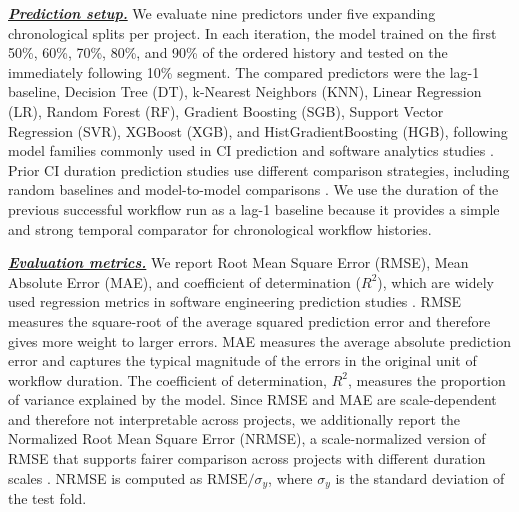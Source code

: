 \documentclass[conference]{IEEEconf}
\newcommand{\ali}[1]{\textcolor{red}{{\it [Ali: #1]}}}
\newcommand{\jasem}[1]{\textcolor{blue}{{\it [Jasem: #1]}}}
\begin{document}
\noindent\underline{\textbf{\textit{Prediction setup.}}} We evaluate nine predictors under five expanding chronological splits per project. In each iteration, the model trained on the first 50\%, 60\%, 70\%, 80\%, and 90\% of the ordered history and tested on the immediately following 10\% segment. The compared predictors were the lag-1 baseline, Decision Tree (DT), k-Nearest Neighbors (KNN), Linear Regression (LR), Random Forest (RF), Gradient Boosting (SGB), Support Vector Regression (SVR), XGBoost (XGB), and HistGradientBoosting (HGB), following model families commonly used in CI prediction and software analytics studies \cite{Bisong2017BuildTimeModels,Arora2021AgileEffortRegression,Wu2022DockerBuildDuration}. Prior CI duration prediction studies use different comparison strategies, including random baselines and model-to-model comparisons \cite{Wu2022DockerBuildDuration,Bisong2017BuildTimeModels}. We use the duration of the previous successful workflow run as a lag-1 baseline because it provides a simple and strong temporal comparator for chronological workflow histories.



\noindent\underline{\textbf{\textit{Evaluation metrics.}}} We report Root Mean Square Error (RMSE), Mean Absolute Error (MAE), and coefficient of determination ($R^2$), which are widely used regression metrics in software engineering prediction studies \cite{Wu2022DockerBuildDuration,Arora2021AgileEffortRegression}. RMSE measures the square-root of the average squared prediction error and therefore gives more weight to larger errors. MAE measures the average absolute prediction error and captures the typical magnitude of the errors in the original unit of workflow duration. The coefficient of determination, $R^2$, measures the proportion of variance explained by the model. Since RMSE and MAE are scale-dependent and therefore not interpretable across projects, we additionally report the Normalized Root Mean Square Error (NRMSE), a scale-normalized version of RMSE that supports fairer comparison across projects with different duration scales \cite{Ramakrishnan2020WebPerf}. NRMSE is computed as $\mathrm{RMSE}/\sigma_y$, where $\sigma_y$ is the standard deviation of the test fold.
\end{document}
